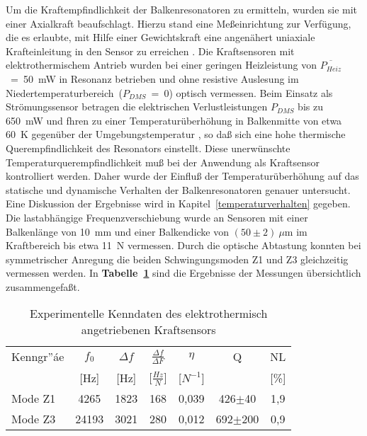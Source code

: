 Um die Kraftempfindlichkeit der Balkenresonatoren zu ermitteln, wurden
sie mit einer Axialkraft beaufschlagt. Hierzu stand eine
Meßeinrichtung zur Verfügung, die es erlaubte, mit Hilfe einer Gewichtskraft
eine angenähert uniaxiale Krafteinleitung in den Sensor zu erreichen
\cite{Mue92}.
Die Kraftsensoren mit elektrothermischem Antrieb wurden bei einer geringen
Heizleistung von $\overline{P_{Heiz}}$~=~50~mW in Resonanz betrieben und
ohne resistive Auslesung im \glqq Niedertemperaturbereich\grqq \,
($P_{DMS}$~=~0) optisch vermessen. Beim Einsatz als Strömungssensor
betragen die elektrischen Verlustleistungen $P_{DMS}$ bis zu 650~mW und
fhren zu einer Temperaturüberhöhung in Balkenmitte
von etwa 60~K gegenüber der Umgebungstemperatur \cite{Bar93},
so daß sich eine
hohe thermische Querempfindlichkeit des Resonators einstellt. Diese
unerwünschte Temperaturquerempfindlichkeit muß bei der Anwendung als
Kraftsensor kontrolliert werden. Daher wurde der Einfluß der
Temperaturüberhöhung auf das statische und dynamische Verhalten der
Balkenresonatoren genauer untersucht. Eine Diskussion der Ergebnisse
wird in Kapitel~\ref{temperaturverhalten} gegeben.\\
%
Die lastabhängige Frequenzverschiebung wurde an Sensoren mit einer
Balkenlänge von 10~mm und einer Balkendicke von $(50\pm2)~\mu$m im
Kraftbereich bis etwa 11~N vermessen. Durch die
optische Abtastung konnten bei symmetrischer Anregung die beiden
Schwingungsmoden Z1 und Z3 gleichzeitig vermessen werden. In
{\bf Tabelle~\ref{tabkraftmessung}} sind die Ergebnisse der Messungen
übersichtlich zusammengefaßt.
\begin{table}[htb]
\caption{\label{tabkraftmessung}
 Experimentelle Kenndaten des elektrothermisch angetriebenen Kraftsensors}
\begin{center}
\begin{tabular}{|l||c|c|c|c|c|c|}
\hline
 Kenngr”áe & $f_{0}$ & $\Delta f$ & $\frac{\Delta f}{\Delta F}$ & $\eta$ & Q & NL \\
           & [Hz]    & [Hz] & [$\frac{Hz}{N}$] & [$N^{-1}$] & & [\%]\\
\hline \hline
 Mode Z1   & 4265    & 1823 & 168  &  0,039 & 426$\pm$40   & 1,9 \\
\hline
 Mode Z3   & 24193   & 3021 & 280  &  0,012 & 692$\pm$200  & 0,9 \\
\hline
\end{tabular}
\end{center}
\end{table}
